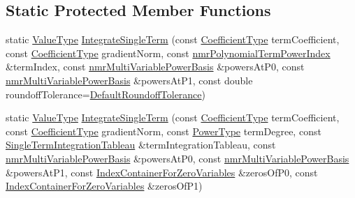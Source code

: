 \subsection*{Static Protected Member Functions}
\begin{DoxyCompactItemize}
\item 
static \hyperlink{classnmr_bernstein_polynomial_line_integral_ab1d3f80540e0791f359e53b3ef074a86}{Value\-Type} \hyperlink{classnmr_bernstein_polynomial_line_integral_a7adbcbff96185a3c803f8e0afae7c263}{Integrate\-Single\-Term} (const \hyperlink{classnmr_bernstein_polynomial_line_integral_a0dc7480d6f60af6d3d8da6e32444edf7}{Coefficient\-Type} term\-Coefficient, const \hyperlink{classnmr_bernstein_polynomial_line_integral_a0dc7480d6f60af6d3d8da6e32444edf7}{Coefficient\-Type} gradient\-Norm, const \hyperlink{classnmr_polynomial_term_power_index}{nmr\-Polynomial\-Term\-Power\-Index} \&term\-Index, const \hyperlink{classnmr_multi_variable_power_basis}{nmr\-Multi\-Variable\-Power\-Basis} \&powers\-At\-P0, const \hyperlink{classnmr_multi_variable_power_basis}{nmr\-Multi\-Variable\-Power\-Basis} \&powers\-At\-P1, const double roundoff\-Tolerance=\hyperlink{classnmr_bernstein_polynomial_line_integral_acd99dd062ecb011d518908d73b5f6c80}{Default\-Roundoff\-Tolerance})
\item 
static \hyperlink{classnmr_bernstein_polynomial_line_integral_ab1d3f80540e0791f359e53b3ef074a86}{Value\-Type} \hyperlink{classnmr_bernstein_polynomial_line_integral_af8a264777d4cea8caef1f09a15ccae1c}{Integrate\-Single\-Term} (const \hyperlink{classnmr_bernstein_polynomial_line_integral_a0dc7480d6f60af6d3d8da6e32444edf7}{Coefficient\-Type} term\-Coefficient, const \hyperlink{classnmr_bernstein_polynomial_line_integral_a0dc7480d6f60af6d3d8da6e32444edf7}{Coefficient\-Type} gradient\-Norm, const \hyperlink{classnmr_bernstein_polynomial_line_integral_a0e07aee2cb7c5f3f5d2c1f95cd4e9abf}{Power\-Type} term\-Degree, const \hyperlink{classnmr_bernstein_polynomial_line_integral_a1d31908eb8195d1c00427f12dee7fe6b}{Single\-Term\-Integration\-Tableau} \&term\-Integration\-Tableau, const \hyperlink{classnmr_multi_variable_power_basis}{nmr\-Multi\-Variable\-Power\-Basis} \&powers\-At\-P0, const \hyperlink{classnmr_multi_variable_power_basis}{nmr\-Multi\-Variable\-Power\-Basis} \&powers\-At\-P1, const \hyperlink{classnmr_bernstein_polynomial_line_integral_ad240bb2714fe8f3ce33ba2fa696931f8}{Index\-Container\-For\-Zero\-Variables} \&zeros\-Of\-P0, const \hyperlink{classnmr_bernstein_polynomial_line_integral_ad240bb2714fe8f3ce33ba2fa696931f8}{Index\-Container\-For\-Zero\-Variables} \&zeros\-Of\-P1)

\end{DoxyCompactItemize}
